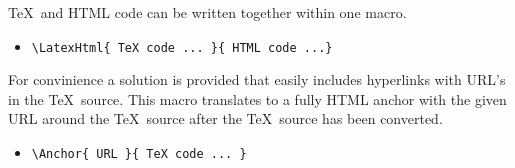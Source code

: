 \documentclass[12pt]{article}
\begin{document}
\TeX\ and HTML code can be written together within one macro.

\begin{itemize}
    \item
        \verb+\LatexHtml{ TeX code ... }{ HTML code ...}+
\end{itemize}

For convinience a solution is provided that easily includes
hyperlinks with URL's in the \TeX\ source. This macro translates to a
fully HTML anchor with the given URL around the \TeX\ source after the
\TeX\ source has been converted.

\begin{itemize}
    \item
        \verb+\Anchor{ URL }{ TeX code ... }+
\end{itemize}
\end{document}
